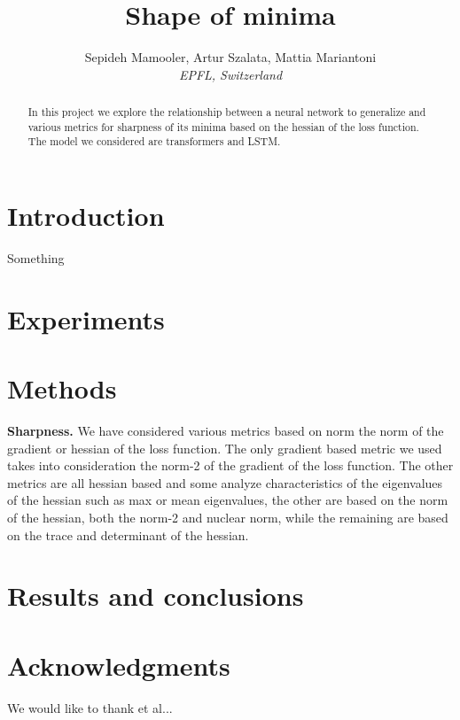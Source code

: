 \documentclass[10pt,conference,compsocconf]{IEEEtran}
\newcommand{\parabf}[1]{\vspace{1mm}\noindent\textbf{#1}}
\begin{document}
\title{Shape of minima}

\author{
  
Sepideh Mamooler, Artur Szalata, Mattia Mariantoni\\
  \textit{EPFL, Switzerland}
}

\maketitle

\begin{abstract}
In this project we explore the relationship between a neural network to generalize and various metrics for sharpness of its minima based on the hessian of the loss function. The model we considered are transformers and LSTM.
\end{abstract}

\section{Introduction}\label{sec:intro}
Something \cite{keskar}

\section{Experiments}\label{sec:data}


\section{Methods}\label{sec:model}
\parabf{Sharpness.} We have considered various metrics based on norm the norm of the gradient or hessian of the loss function. The only gradient based metric we used takes into consideration the norm-2 of the gradient of the loss function. The other metrics are all hessian based and some analyze characteristics of the eigenvalues of the hessian such as max or mean eigenvalues, the other are based on the norm of the hessian, both the norm-2 and nuclear norm, while the remaining are based on the trace and determinant of the hessian.

\section{Results and conclusions}\label{sec:results}




\section*{Acknowledgments}
We would like to thank et al...



\end{document}
